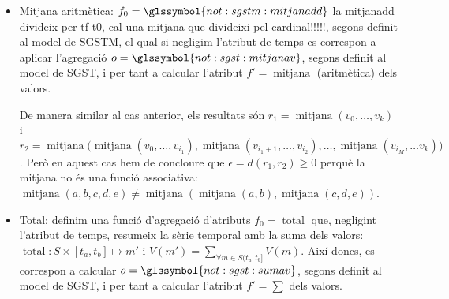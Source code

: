 \begin{example}
\begin{itemize}
    Podem concloure que en aquest cas $r_1=r_2$, i per tant
    $\epsilon=d(r_1,r_2)=0$ , perquè $\max(v_0,\dotsc, v_k) =
    \max\big( \max(v_0,\dotsc,v_{i_1}),
    \max(v_{i_1+1},\dotsc,v_{i_2}), \dotsc, \max(v_{i_M}, \dotsc v_k)
    \big)$ i $\max$ és una funció associativa: $\max(a,b,c,d,e) = \max(
    \max(a,b), \max(c,d,e))$.

    En aquest exemple hem negligit els temps resultants de
    l'agregació. És a dir, $r_1$ és correspon amb una o més d'una
    mesura $m_a\in S: V(m_a)=r_1$ i de la mateixa manera $m_b\in S':
    V(m_b)=r_2$ on hem conclòs que $V(m_a)=V(m_b)$. Això no obstant,
    en general els temps d'aquestes mesures no es correspondran,
    $T(m_a)\neq T(m_b)$ perquè $f_0=\glssymbol{not:sgstm:maxdd}$
    resumeix els atributs de temps segons l'interval de consolidació i
    al marge del resum de la informació en els valors.



\item   Mitjana aritmètica:
  $f_0=\glssymbol{not:sgstm:mitjanadd}$ la mitjanadd
  divideix per tf-t0, cal una mitjana que divideixi pel
  cardinal!!!!!, segons definit al model de
  \gls{SGSTM}, el qual si negligim l'atribut de temps es correspon a
  aplicar l'agregació $o=\glssymbol{not:sgst:mitjanav}$, segons
  definit al model de \gls{SGST}, i per tant a calcular l'atribut
  $f'=\operatorname{mitjana}$ (aritmètica) dels valors.

    De manera similar al cas anterior, els resultats són
    $r_1=\operatorname{mitjana}(v_0,\dotsc, v_k)$ i
    $r_2=\operatorname{mitjana}\big(
    \operatorname{mitjana}(v_0,\dotsc,v_{i_1}),
    \operatorname{mitjana}(v_{i_1+1},\dotsc,v_{i_2}), \dotsc,
    \operatorname{mitjana}(v_{i_M}, \dotsc v_k) \big)$.  Però en
    aquest cas hem de concloure que $\epsilon=d(r_1,r_2)\geq 0$ perquè
    la mitjana no és una funció associativa:
    $\operatorname{mitjana}(a,b,c,d,e) \neq \operatorname{mitjana}(
    \operatorname{mitjana}(a,b), \operatorname{mitjana}(c,d,e))$.
 


  \item Total: definim una funció d'agregació d'atributs
    $f_0=\operatorname{total}$ que, negligint l'atribut de temps,
    resumeix la sèrie temporal amb la suma dels valors:
    $\operatorname{total}: S \times [t_a,t_b] \mapsto m'$ i $V(m') =
    \sum\limits_{\forall m\in S(t_a,t_b]} V(m)$. Així doncs, es
    correspon a calcular $o=\glssymbol{not:sgst:sumav}$, segons
    definit al model de \gls{SGST}, i per tant a calcular l'atribut
    $f'=\sum$ dels valors.


\end{itemize}
\end{example}
